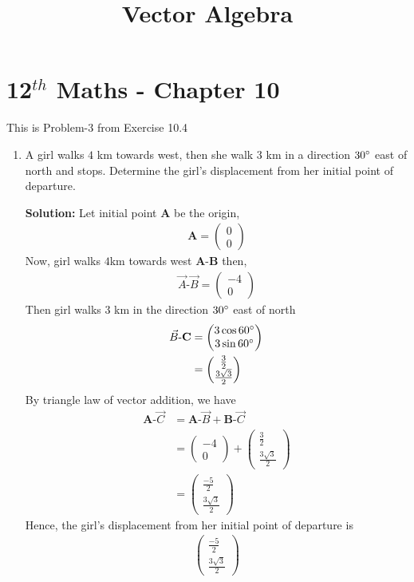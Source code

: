 \documentclass[12pt]{article}
\newcommand{\solution}{\noindent \textbf{Solution: }}
\newcommand{\myvec}[1]{\ensuremath{\begin{pmatrix}#1\end{pmatrix}}}
\let\vec\mathbf
\begin{document}
\begin{center}
\enlargethispage{-4cm}
\title{\textbf{Vector Algebra}}
\date{\vspace{-5ex}} %
\maketitle
\end{center}
\setcounter{page}{1}
\section*{12$^{th}$ Maths - Chapter 10}
This is Problem-3 from Exercise 10.4
\begin{enumerate}
\item A girl walks $4$ km towards west, then she walk $3$ km in a direction $30\degree$ east of north and stops. Determine the girl's displacement from her initial point of departure.

\solution 
		Let initial point $\vec{A}$ be the origin,  
\begin{align}
	\vec{A}=\myvec{0\\0}
	\end{align}
Now, girl walks $4$km towards west $\vec{A}$-$\vec{B}$ then,
		\begin{align}
			\Vec{A}\text{-}\Vec{B}=\myvec{-4\\0}
\end{align}
Then girl walks 3 km in the direction $30\degree$ east of north
 \begin{align}
	 \Vec{B}\text{-}\vec{C}&=\myvec{3\cos{60\degree}\\3\sin{60\degree}}\\
&=\myvec{\frac{3}{2}\\ \frac{3\sqrt{3}}{2}}
 \end{align}
 By triangle law of vector addition, we have
\begin{align}
	\vec{A}\text{-}\Vec{C} &= \vec{A}\text{-}\Vec{B}+\vec{B}\text{-}\Vec{C}\\
 &=\myvec{-4\\0}+\myvec{\frac{3}{2}\\[2pt] \frac{3\sqrt{3}}{2}}\\
 &=\myvec{\frac{-5}{2}\\[2pt] \frac{3\sqrt{3}}{2}}
\end{align}
  Hence, the girl's displacement from her initial point of departure is 
\begin{align}
\myvec{\frac{-5}{2}\\[2pt] \frac{3\sqrt{3}}{2}}
\end{align}


\end{enumerate}
\end{document}

